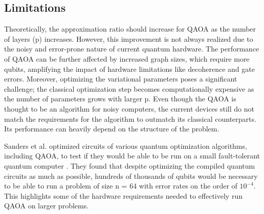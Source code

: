 \subsection{Limitations}
Theoretically, the approximation ratio should increase for QAOA as the number of layers (p) increases. However, this improvement is not always realized due to the noisy and error-prone nature of current quantum hardware. The performance of QAOA can be further affected by increased graph sizes, which require more qubits, amplifying the impact of hardware limitations like decoherence and gate errors. Moreover, optimizing the variational parameters poses a significant challenge; the classical optimization step becomes computationally expensive as the number of parameters grows with larger p. Even though the QAOA is thought to be an algorithm for noisy computers, the current devices still do not match the requirements for the algorithm to outmatch its classical counterparts. Its performance can heavily depend on the structure of the problem. 

Sanders et al. optimized circuits of various quantum optimization algorithms, including QAOA, to test if they would be able to be run on a small fault-tolerant quantum computer \cite{Sanders_2020}. They found that despite optimizing the compiled quantum circuits as much as possible, hundreds of thousands of qubits would be necessary to be able to run a problem of size n = 64 with error rates on the order of $10^{-4}$. This highlights some of the hardware requirements needed to effectively run QAOA on larger problems.